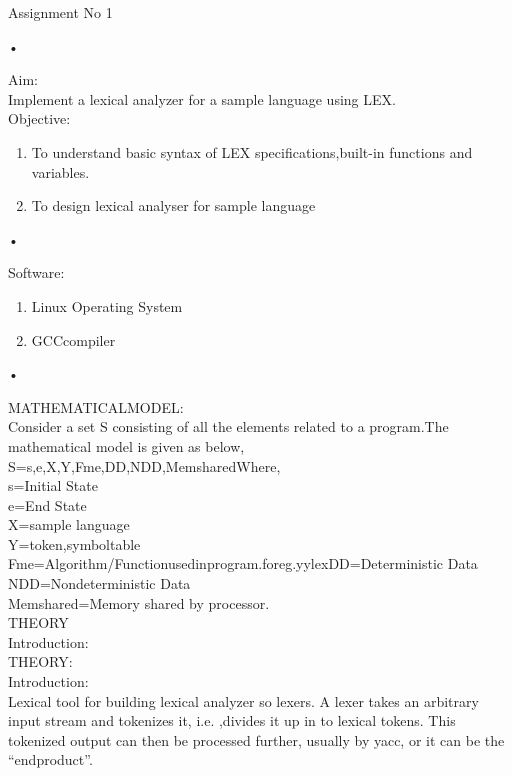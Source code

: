 \documentclass[11pt]{article}
\begin{document}
	
	\begin{center}
		Assignment No 1
	\end{center}•
	
	\noindent
	Aim:\\Implement a lexical analyzer for a sample language using LEX.\\
	
	\noindent
	Objective:\\
	\begin{enumerate}
		\item To understand basic syntax of LEX specifications,built-in functions and variables.
		\item To design lexical analyser for sample language
	\end{enumerate}•
	
	\noindent
	Software:\\
	\begin{enumerate}
		\item Linux Operating System
		\item GCCcompiler
	\end{enumerate}•
	
	\noindent
	MATHEMATICALMODEL:\\
	
	\noindent
	Consider a set S consisting of all the elements related to a program.The mathematical model is given as below,\\
	S={s,e,X,Y,Fme,DD,NDD,Memshared}Where,\\
	s=Initial State\\
	e=End State\\
	X=sample language\\
	Y={token,symboltable}\\
	Fme=Algorithm/Functionusedinprogram.foreg.{yylex}DD=Deterministic Data\\
	NDD=Nondeterministic Data\\
	Memshared=Memory shared by processor.\\
	
	\noindent
	THEORY\\
	Introduction:\\
	THEORY:\\
	Introduction:\\
	
	\noindent
	Lexical tool for building lexical analyzer so lexers. A lexer takes an arbitrary input stream and tokenizes it, i.e. ,divides it up in to lexical tokens. This tokenized output can then be processed further, usually by yacc, or it can be the “endproduct”.\\
	
\end{document}
